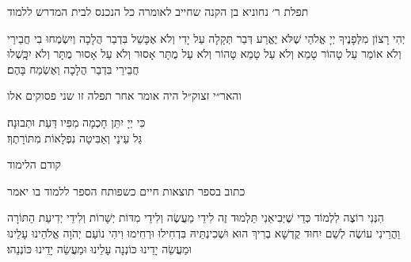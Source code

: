 \clearpage
\thispagestyle{empty}

\centerlastline
{
\small
\parskip 2pt
{\centering
  \scriptsize
  תפלת ר׳ נחוניא בן הקנה שחייב לאומרה כל הנכנס לבית המדרש ללמוד

}

יְהִי רָצוֹן מִלְּפָנֶיךָ יְיָ אֱלֹהַי שֶׁלֹּא יֶאֱרַע דְּבַר תְּקָלָה עַל יָדִי וְלֹא אֶכָּשֵׁל בִּדְבַר הֲלָכָה
וְיִשְׂמְחוּ בִי חֲבֵירַי וְלֹא אוֹמַר עַל טָהוֹר טָמֵא וְלֹא עַל טָמֵא טָהוֹר וְלֹא עַל מֻתָּר אָסוּר
וְלֹא עַל אָסוּר מֻתָּר וְלֹא יִכָּֽשְׁלוּ חֲבֵירַי בִּדְבַר הֲלָכָה וְאֶשְׂמַח בָּהֶם׃

{\centering
  {\scriptsize
    והאר״י זצוק״ל היה אומר אחר תפלה זו שני פסוקים אלו

    }
    כִּי יְיָ יִתֵּן חָכְמָה מִפִּיו דַּעַת וּתְבוּנָה׃\\
    גַּל עֵינַי וְאַבִּיטָה נִפְלָאוֹת מִתּוֹרָתֶךָ׃

    \vspace{1em}
   {\larger קודם הלימוד}

    {\scriptsize כתוב בספר תוצאות חיים כשפותח הספר ללמוד בו יאמר}
}

הִנְּנִי רוֹצֶה לִלְמוֹד כְּדֵי שֶׁיְּבִיאֵנִי תַּלְמוּד זֶה לִידֵי מַעֲשֶׂה וְלִידֵי מִדּוֹת יְשָׁרוֹת\hdot
וְלִידֵי יְדִיעַת הַתּוֹרָה\hdot
וַהֲרֵינִי עוֹשֶׂה לְשֵׁם יִחוּד קֻדְשָׁא בְרִיךְ הוּא וּשְׁכִינְתֵּיהּ בִּדְחִילוּ וּרְחִימוּ\hdot
וִיהִי נוֹעַם יְהֹוָה אֱלֹהֵינוּ עָלֵינוּ וּמַעֲשֵׂה יָדֵינוּ כּוֹנְנָה עָלֵינוּ וּמַעֲשֵׂה יָדֵינוּ כּוֹנְנֵהוּ׃

}
